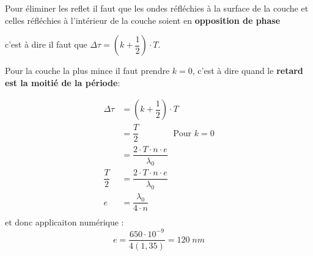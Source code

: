 \documentclass[11pt,a4paper]{article}
\newcommand{\es}[1]{\cdot10^{#1}}
\begin{document}
Pour éliminer les reflet il faut que les ondes réfléchies à la surface de la couche et celles réfléchies à l’intérieur de la couche soient en \textbf{opposition de phase}

c’est à dire il faut que $ \Delta\tau=( k+\dfrac{1}{2}) \cdot T$. 

Pour la couche la plus mince il faut prendre $k=0$, c’est à dire quand le \textbf{retard est la moitié de la période}: 
\quad {}

\begin{align*}
    \Delta\tau &= ( k+\dfrac{1}{2}) \cdot T \\
        &= \dfrac{T}{2} \quad\quad \quad\quad \text{Pour $k=0$} \\
        &= \dfrac{2\cdot T\cdot n\cdot e}{\lambda_0} \quad \quad\quad\quad\quad\\
        \dfrac{T}{2} &=\dfrac{2\cdot T\cdot n\cdot e}{\lambda_0}\\
        e &= \dfrac{\lambda_0}{4\cdot n}\\ 
\end{align*} 
et donc applicaiton numérique : 
$$ e=\dfrac{650\es{-9}}{4(1,35)} = 120\; nm$$
\end{document}
